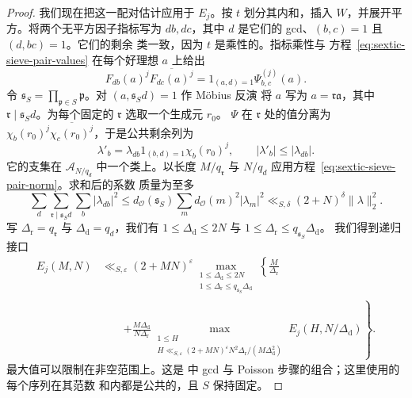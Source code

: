 \documentclass[11pt,a4paper]{article}
\numberwithin{equation}{section}
\numberwithin{figure}{section}
\theoremstyle{definition}
\theoremstyle{remark}
\begin{document}
\begin{proof}
我们现在把这一配对估计应用于 $E_j$。按
$t$ 划分其内和，插入 $W$，并展开平方。将两个无平方因子指标写为
$db,dc$，其中 $d$ 是它们的 gcd、$(b,c)=1$ 且 $(d,bc)=1$。它们的剩余
类一致，因为 $t$ 是乘性的。指标乘性与
方程~\eqref{eq:sextic-sieve-pair-values} 在每个好理想 $a$ 上给出
\[
 F_{db}(a)^j\overline{F_{dc}(a)^j}
   =1_{(a,d)=1}\Psi_{b,c}^{(j)}(a).
\]
令 $\mathfrak s_S=\prod_{\mathfrak p\in S}\mathfrak p$。对 $(a,\mathfrak s_Sd)=1$ 作 M\"obius 反演
将 $a$ 写为 $a=\mathfrak r\mathfrak a$，其中
$\mathfrak r\mid\mathfrak s_Sd$。为每个固定的 $\mathfrak r$ 选取一个生成元 $r_0$。
$\Psi$ 在 $\mathfrak r$ 处的值分离为
$\chi_b(r_0)^j\overline{\chi_c(r_0)^j}$，于是公共剩余列为
\[
 \lambda'_b=\lambda_{db}1_{(b,d)=1}\chi_b(r_0)^j,
 \qquad |\lambda'_b|\le|\lambda_{db}|.
\]
它的支集在 $\mathcal A_{N/q_d}$ 中一个类上。以长度 $M/q_{\mathfrak r}$
与 $N/q_d$ 应用方程~\eqref{eq:sextic-sieve-pair-norm}。求和后的系数
质量为至多
\[
 \sum_d\sum_{\mathfrak r\mid\mathfrak s_Sd}\sum_b|\lambda_{db}|^2
 \le d_{\mathcal O}(\mathfrak s_S)
       \sum_m d_{\mathcal O}(m)^2|\lambda_m|^2
 \ll_{S,\delta}(2+N)^\delta\|\lambda\|_2^2.
\]
写 $\Delta_{\mathrm r}=q_{\mathfrak r}$ 与 $\Delta_{\mathrm d}=q_d$，我们有
$1\le\Delta_{\mathrm d}\le2N$ 与 $1\le\Delta_{\mathrm r}\le q_{\mathfrak s_S}\Delta_{\mathrm d}$。
我们得到递归接口
\begin{equation}\label{eq:sextic-sieve-norm-reflection}
 \begin{split}
 E_j(M,N)
 &\ll_{S,\varepsilon}(2+MN)^\varepsilon
 \max_{\substack{1\le\Delta_{\mathrm d}\le2N\\
                 1\le\Delta_{\mathrm r}\le q_{\mathfrak s_S}\Delta_{\mathrm d}}}
 \left\{\frac M{\Delta_{\mathrm r}}\right.\\
 &\qquad\left.+
 \frac{M\Delta_{\mathrm d}}{N\Delta_{\mathrm r}}
 \max_{\substack{1\le H\\
       H\ll_{S,\varepsilon}(2+MN)^\varepsilon
              N^2\Delta_{\mathrm r}/(M\Delta_{\mathrm d}^2)}}
       E_j(H,N/\Delta_{\mathrm d})\right\}.
 \end{split}
\end{equation}
最大值可以限制在非空范围上。这是 \cite[引理~3.2--3.3]{BGL} 中
gcd 与 Poisson 步骤的组合；这里使用的每个序列在其范数
和内都是公共的，且 $S$ 保持固定。


\end{proof}
\end{document}
